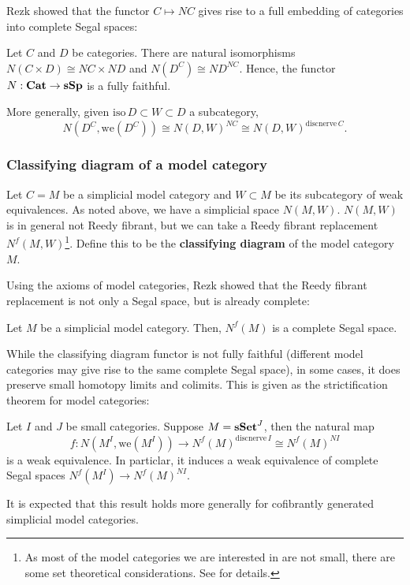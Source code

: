 \begin{refsection}
\begin{eg}
\begin{enumerate}
Rezk showed that the functor $C\mapsto NC$ gives rise to a full embedding of categories into complete Segal spaces:
\begin{prop}\label{nerveprop}
Let $C$ and $D$ be categories. There are natural isomorphisms $N(C\times D)\cong NC\times ND$ and $N(D^C)\cong ND^{NC}$. Hence, the functor $N:\mathbf{Cat}\to \mathbf{sSp}$ is a fully faithful. 

More generally, given $\mathrm{iso}\,D\subset W\subset D$ a subcategory,
$$N(D^C,\mathrm{we}(D^C))\cong N(D,W)^{NC}\cong N(D,W)^{\mathrm{discnerve}\,C}.$$
\end{prop}
\end{enumerate}
\end{eg}

\subsubsection{Classifying diagram of a model category}
Let $C=M$ be a simplicial model category and $W\subset M$ be its subcategory of weak equivalences. As noted above, we have a simplicial space $N(M,W)$. $N(M,W)$ is in general not Reedy fibrant, but we can take a Reedy fibrant replacement $N^f(M,W)$\footnote{As most of the model categories we are interested in are not small, there are some set theoretical considerations. See \cite{rezk-a-model-for-the-homotopy-theory-of-homotopy-theories} for details.}. Define this to be the \textbf{classifying diagram} of the model category $M$.

Using the axioms of model categories, Rezk showed that the Reedy fibrant replacement is not only a Segal space, but is already complete:
\begin{thm}
Let $M$ be a simplicial model category. Then, $N^f(M)$ is a complete Segal space.
\end{thm}

While the classifying diagram functor is not fully faithful (different model categories may give rise to the same complete Segal space), in some cases, it does preserve small homotopy limits and colimits. This is given as the strictification theorem for model categories:
\begin{thm}
Let $I$ and $J$ be small categories. Suppose $M=\mathbf{sSet}^J$, then the natural map 
$$f:N(M^I,\mathrm{we}(M^I))\to N^f(M)^{\mathrm{discnerve}\,I}\cong N^f(M)^{NI}$$ 
is a weak equivalence. In particlar, it induces a weak equivalence of complete Segal spaces $N^f(M^I)\to N^f(M)^{NI}$.
\end{thm}
It is expected that this result holds more generally for cofibrantly generated simplicial model categories.


\end{refsection}
